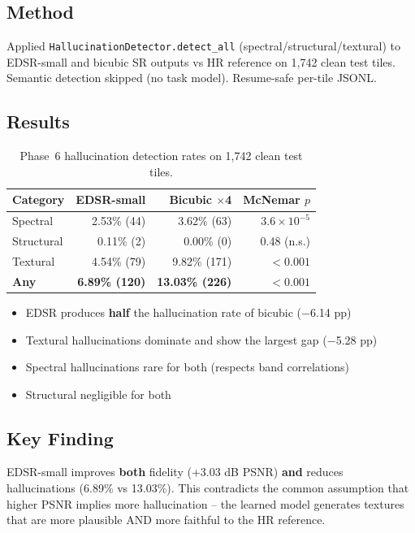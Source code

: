 \subsection{Method}
Applied \texttt{HallucinationDetector.detect\_all} (spectral/structural/textural) to EDSR-small and bicubic SR outputs vs HR reference on 1,742 clean test tiles. Semantic detection skipped (no task model). Resume-safe per-tile JSONL.

\subsection{Results}

\begin{table}[h]
\centering
\caption{Phase~6 hallucination detection rates on 1,742 clean test tiles.}
\label{tab:hall}
\begin{tabular}{lrrr}
\toprule
Category & EDSR-small & Bicubic $\times$4 & McNemar $p$ \\
\midrule
Spectral & 2.53\% (44) & 3.62\% (63) & $3.6 \times 10^{-5}$ \\
Structural & 0.11\% (2) & 0.00\% (0) & 0.48 (n.s.) \\
Textural & 4.54\% (79) & 9.82\% (171) & $< 0.001$ \\
\textbf{Any} & \textbf{6.89\% (120)} & \textbf{13.03\% (226)} & $< 0.001$ \\
\bottomrule
\end{tabular}
\end{table}

\begin{itemize}
    \item EDSR produces \textbf{half} the hallucination rate of bicubic ($-$6.14 pp)
    \item Textural hallucinations dominate and show the largest gap ($-$5.28 pp)
    \item Spectral hallucinations rare for both (respects band correlations)
    \item Structural negligible for both
\end{itemize}

\subsection{Key Finding}
EDSR-small improves \textbf{both} fidelity (+3.03 dB PSNR) \textbf{and} reduces hallucinations (6.89\% vs 13.03\%). This contradicts the common assumption that higher PSNR implies more hallucination -- the learned model generates textures that are more plausible AND more faithful to the HR reference.
